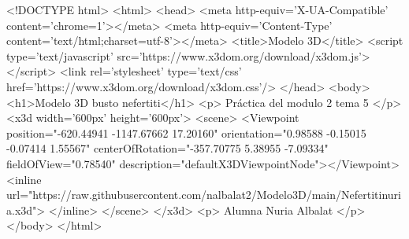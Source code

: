 <!DOCTYPE html>
<html>
<head>
<meta http-equiv='X-UA-Compatible' content='chrome=1'></meta>
<meta http-equiv='Content-Type' content='text/html;charset=utf-8'></meta>
<title>Modelo 3D</title>
<script type='text/javascript' src='https://www.x3dom.org/download/x3dom.js'> </script>
<link rel='stylesheet' type='text/css' href='https://www.x3dom.org/download/x3dom.css'/>
</head>
<body>
<h1>Modelo 3D busto nefertiti</h1>
<p>
    Práctica del modulo 2 tema 5
</p>
<x3d width='600px' height='600px'>
<scene>
	<Viewpoint position="-620.44941 -1147.67662 17.20160" orientation="0.98588 -0.15015 -0.07414 1.55567" 
		centerOfRotation="-357.70775 5.38955 -7.09334" fieldOfView="0.78540" description="defaultX3DViewpointNode"></Viewpoint>
<inline url="https://raw.githubusercontent.com/nalbalat2/Modelo3D/main/Nefertitinuria.x3d"> </inline>
</scene>
</x3d>
<p>
    Alumna Nuria Albalat
</p>
  </body>
</html>
